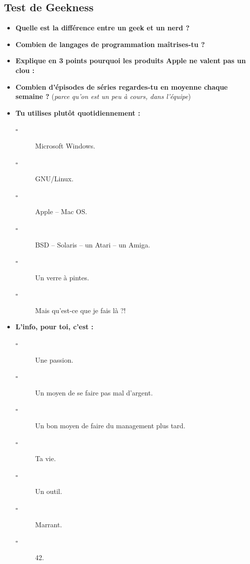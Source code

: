 \subsection*{Test de Geekness}
\vspace{1em}
\begin{itemize}
    \item \textbf{Quelle est la différence entre un geek et un nerd ?}
    \vspace{5cm}
    \item \textbf{Combien de langages de programmation maîtrises-tu ?}
    \vspace{4cm}
    \item \textbf{Explique en 3 points pourquoi les produits Apple ne valent
	pas un clou :}
    \vspace{5cm}
    \item \textbf{Combien d'épisodes de séries regardes-tu en moyenne chaque
	semaine ?} (\emph{parce qu'on est un peu à cours, dans l'équipe})
    \vspace{5cm}
    
    \item \textbf{Tu utilises plutôt quotidiennement :}
    \begin{description}
	\item[$\square$] Microsoft Windows.
	\item[$\square$] GNU/Linux.
	\item[$\square$] Apple -- Mac OS.
	\item[$\square$] BSD -- Solaris -- un Atari -- un Amiga.
	\item[$\square$] Un verre à pintes.
	\item[$\square$] Mais qu'est-ce que je fais là ?!
    \end{description}
	
	\newpage
	
    \item \textbf{L'info, pour toi, c'est :}
    \begin{description}
	\item[$\square$] Une passion.
	\item[$\square$] Un moyen de se faire pas mal d'argent.
	\item[$\square$] Un bon moyen de faire du management plus tard.
	\item[$\square$] Ta vie.
	\item[$\square$] Un outil.
	\item[$\square$] Marrant.
	\item[$\square$] 42.
    \end{description}
	\vspace{1em}
	

\end{itemize}
